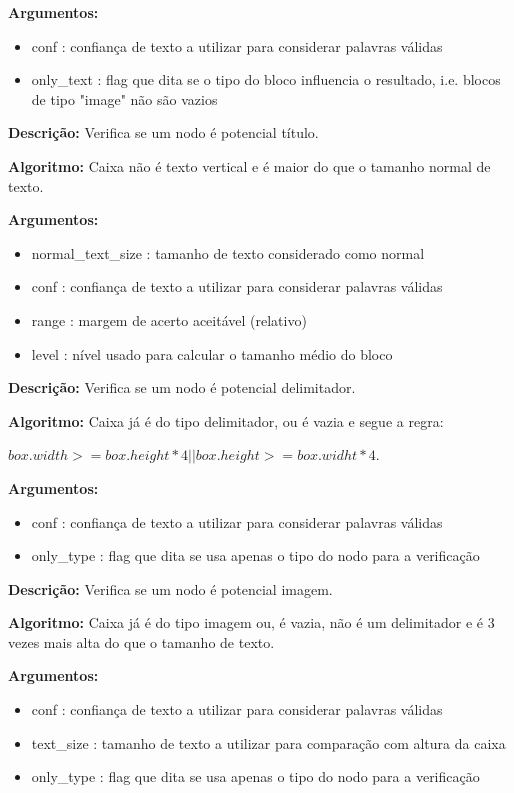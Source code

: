 \textbf{Argumentos:}
\begin{itemize}\setlength\itemsep{-0.3em}
	\item conf : confiança de texto a utilizar para considerar palavras válidas
	\item only\_text : flag que dita se o tipo do bloco influencia o resultado, i.e. blocos de tipo "image" não são vazios
\end{itemize}

	

\textbf{Descrição:} Verifica se um nodo é potencial título.
	
\textbf{Algoritmo:} Caixa não é texto vertical e é maior do que o tamanho normal de texto.


\textbf{Argumentos:}
\begin{itemize}\setlength\itemsep{-0.3em}
	\item normal\_text\_size : tamanho de texto considerado como normal
	\item conf : confiança de texto a utilizar para considerar palavras válidas
	\item range : margem de acerto aceitável (relativo)
	\item level : nível usado para calcular o tamanho médio do bloco
\end{itemize}

	

\textbf{Descrição:} Verifica se um nodo é potencial delimitador.
	
\textbf{Algoritmo:} Caixa já é do tipo delimitador, ou é vazia e segue a regra:

$ box.width >= box.height*4 || box.height >= box.widht*4 $.


\textbf{Argumentos:}
\begin{itemize}\setlength\itemsep{-0.3em}
	\item conf : confiança de texto a utilizar para considerar palavras válidas
	\item only\_type : flag que dita se usa apenas o tipo do nodo para a verificação
\end{itemize}

	

\textbf{Descrição:} Verifica se um nodo é potencial imagem.
	
\textbf{Algoritmo:} Caixa já é do tipo imagem ou, é vazia, não é um delimitador e é 3 vezes mais alta do que o tamanho de texto.


\textbf{Argumentos:}
\begin{itemize}\setlength\itemsep{-0.3em}
	\item conf : confiança de texto a utilizar para considerar palavras válidas
	\item text\_size : tamanho de texto a utilizar para comparação com altura da caixa
	\item only\_type : flag que dita se usa apenas o tipo do nodo para a verificação
\end{itemize}


